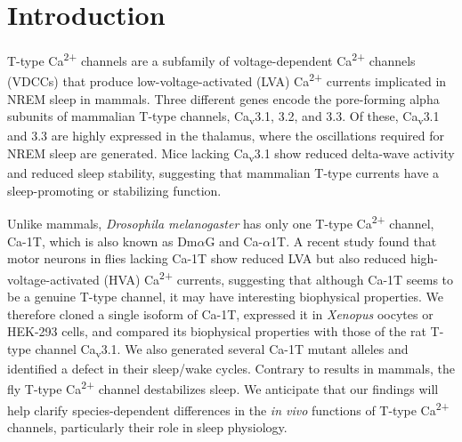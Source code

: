 \section*{Introduction}

T-type Ca\textsuperscript{2+} channels are a subfamily of voltage-dependent Ca\textsuperscript{2+} channels (VDCCs) that produce low-voltage-activated (LVA) Ca\textsuperscript{2+} currents implicated in NREM sleep in mammals\cite{Lee:2004ey}.
Three different genes encode the pore-forming alpha subunits of mammalian T-type channels, Ca\textsubscript{v}3.1, 3.2, and 3.3. Of these, Ca\textsubscript{v}3.1 and 3.3 are highly expressed in the thalamus, where the oscillations required for NREM sleep are generated\cite{steriade:1991aa, dossi:1992aa, talley:1999aa}.
Mice lacking Ca\textsubscript{v}3.1 show reduced delta-wave activity and reduced sleep stability, suggesting that mammalian T-type currents have a sleep-promoting or stabilizing function\cite{Lee:2004ey}.

Unlike mammals, \emph{Drosophila melanogaster} has only one T-type Ca\textsuperscript{2+} channel, Ca-\alpha1T, which is also known as Dm$\alpha$G and Ca-$\alpha$1T.
A recent study found that motor neurons in flies lacking Ca-\alpha1T show reduced LVA but also reduced high-voltage-activated (HVA) Ca\textsuperscript{2+} currents, suggesting that although Ca-\alpha1T seems to be a genuine T-type channel, it may have interesting biophysical properties\cite{Ryglewski:2012jk}.
We therefore cloned a single isoform of Ca-\alpha1T,  expressed it in \emph{Xenopus} oocytes or HEK-293 cells, and compared its biophysical properties with those of the rat T-type channel Ca\textsubscript{v}3.1.
We also generated several Ca-\alpha1T mutant alleles and identified a defect in their sleep/wake cycles. Contrary to results in mammals, the fly T-type Ca\textsuperscript{2+} channel destabilizes sleep.
We anticipate that our findings will help clarify species-dependent differences in the \emph{in vivo} functions of T-type Ca\textsuperscript{2+} channels, particularly their role in sleep physiology.
